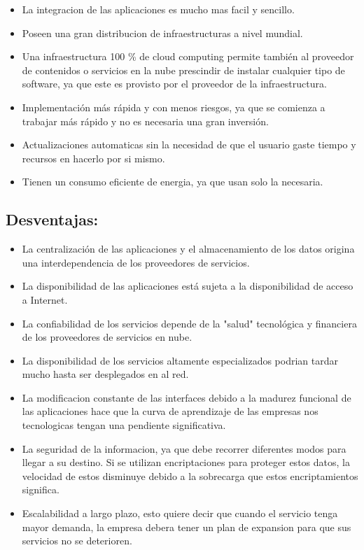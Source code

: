 \documentclass[12pt,letterpaper]{article}
\begin{document}
\begin{itemize}
\item La integracion de las aplicaciones es mucho mas facil y sencillo.
\item Poseen una gran distribucion de infraestructuras a nivel mundial.
\item Una infraestructura 100 \% de cloud computing permite también al proveedor de contenidos o servicios en la nube prescindir de instalar cualquier tipo de software, ya que este es provisto por el proveedor de la infraestructura.
\item Implementación más rápida y con menos riesgos, ya que se comienza a trabajar más rápido y no es necesaria una gran inversión.
\item Actualizaciones automaticas sin la necesidad de que el usuario gaste tiempo y recursos en hacerlo por si mismo.
\item Tienen un consumo eficiente de energia, ya que usan solo la necesaria.
\end{itemize}

\subsection{Desventajas:}
\begin{itemize}
\item La centralización de las aplicaciones y el almacenamiento de los datos origina una interdependencia de los proveedores de servicios.
\item La disponibilidad de las aplicaciones está sujeta a la disponibilidad de acceso a Internet.
\item La confiabilidad de los servicios depende de la "salud" tecnológica y financiera de los proveedores de servicios en nube.
\item La disponibilidad de los servicios altamente especializados podrian tardar mucho hasta ser desplegados en al red.
\item La modificacion constante de las interfaces debido a la madurez funcional de las aplicaciones hace  que la curva de aprendizaje de las empresas nos tecnologicas tengan una pendiente significativa.
\item La seguridad de la informacion, ya que debe recorrer diferentes modos para llegar a su destino. Si se utilizan encriptaciones para proteger estos datos, la velocidad de estos disminuye debido a la sobrecarga que estos encriptamientos significa.
\item Escalabilidad a largo plazo, esto quiere decir que cuando el servicio tenga mayor demanda, la empresa debera tener un plan de expansion para que sus servicios no se deterioren.
	\end{itemize}	
	
\end{document}
